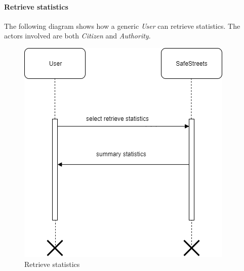 \documentclass{article}
\begin{document}
\paragraph{Retrieve statistics}
The following diagram shows how a generic \textit{User} can retrieve statistics. The actors involved
are both \textit{Citizen} and \textit{Authority}.  
\begin{figure}[H]
    \centering
    \includegraphics[scale=0.5]{img/sequence_diagrams/retrieve_statistics.png}
    \caption{Retrieve statistics}
\end{figure}
\end{document}

